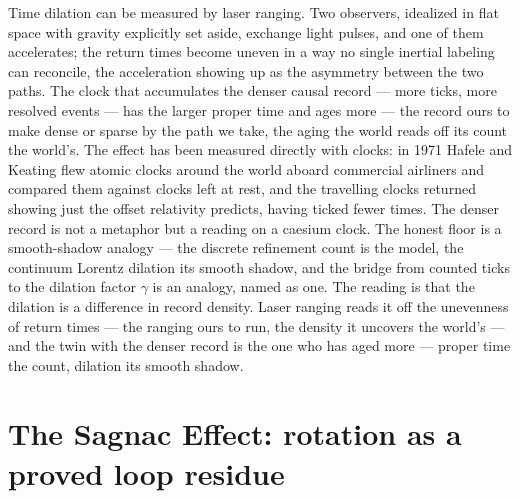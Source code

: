 Time dilation can be measured by laser ranging. Two observers, idealized in flat space with gravity explicitly
set aside, exchange light pulses, and one of them accelerates; the return times become uneven in a way no single
inertial labeling can reconcile, the acceleration showing up as the asymmetry between the two paths. The clock
that accumulates the denser causal record --- more ticks, more resolved events --- has the larger proper time
and ages more --- the record ours to make dense or sparse by the path we take, the aging the world reads off its
count the world's. The effect has
been measured directly with clocks: in 1971 Hafele and Keating flew atomic clocks around the world aboard
commercial airliners and compared them against clocks left at rest, and the travelling clocks returned showing
just the offset relativity predicts, having ticked fewer times. The denser record is not a metaphor but a
reading on a caesium clock. The honest floor is
a smooth-shadow analogy --- the discrete refinement count is the model, the continuum Lorentz dilation its
smooth shadow, and the bridge from counted ticks to the dilation factor $\gamma$ is an analogy, named as one.
The reading is that the dilation is a difference in record density. Laser ranging reads it off the unevenness of
return times --- the ranging ours to run, the density it uncovers the world's --- and the twin with the denser
record is the one who has aged more --- proper time the count,
dilation its smooth shadow.

\section{The Sagnac Effect: rotation as a proved loop residue}
\label{se:sagnac}

